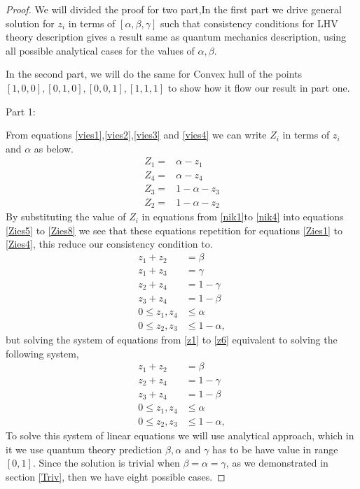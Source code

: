 \begin{proof}
We will divided the proof for two part,In the first part we drive general solution for $z_i$ in terms of $[\alpha, \beta, \gamma]$ such that consistency conditions for LHV theory description gives a result same as quantum mechanics description, using all possible analytical cases for the values of $\alpha,\beta $.


In the second part, we will do the same for Convex hull of the points $[1, 0, 0], [0, 1, 0], [0, 0, 1], [1, 1, 1]$  to show how it flow our result in part one.

Part 1:

From equations \ref{vies1},\ref{vies2},\ref{vies3} and \ref{vies4} we can write $Z_i$ in terms of $z_i$ and $\alpha$ as below.
\begin{align}
Z_1=&\alpha-z_1\label{nik1}\\
Z_4=&\alpha-z_4\label{nik2}\\
Z_3=&1-\alpha-z_3\label{nik3}\\
Z_2=&1-\alpha-z_2\label{nik4}
\end{align}
By substituting the value of $Z_i$ in equations from \ref{nik1}to \ref{nik4} into equations \ref{Zies5} to \ref{Zies8} we see that these equations repetition for equations \ref{Zies1} to \ref{Zies4}, this reduce our consistency condition to.
\begin{align}
z_1+z_2&=\beta\label{z1}\\
z_1+z_3&=\gamma\label{z2}\\
z_2+z_4&=1-\gamma\label{z4}\\
z_3+z_4&=1-\beta\label{z3}\\
0\leq z_1,z_4& \leq \alpha\label{z5}\\
0\leq z_2,z_3 &\leq 1- \alpha\label{z6},
\end{align}
but solving the system of equations from \ref{z1} to \ref{z6} equivalent to solving the following system,
\begin{align}
z_1+z_2&=\beta\label{z1}\\
z_2+z_4&=1-\gamma\label{z42}\\
z_3+z_4&=1-\beta\label{z32}\\
0\leq z_1,z_4& \leq \alpha\label{z52}\\
0\leq z_2,z_3 &\leq 1- \alpha\label{z62},
\end{align}
To solve this system of linear equations we will use analytical approach, which in it we use quantum theory prediction $\beta, \alpha \text{ and } \gamma$ has to be have value in range $[0,1]$.
Since the solution is trivial when $\beta=\alpha=\gamma$, as  we demonstrated in section \ref{Triv}, then we have eight  possible cases.


\end{proof}
